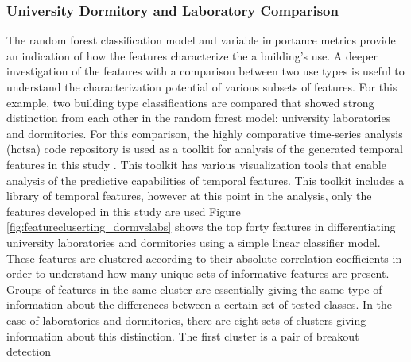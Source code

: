 \subsubsection{University Dormitory and Laboratory Comparison}
\label{sec:dormvslab}

The random forest classification model and variable importance metrics provide an indication of how the features characterize the a building's use. A deeper investigation of the features with a comparison between two use types is useful to understand the characterization potential of various subsets of features. For this example, two building type classifications are compared that showed strong distinction from each other in the random forest model: university laboratories and dormitories. For this comparison, the highly comparative time-series analysis (hctsa) code repository is used as a toolkit for analysis of the generated temporal features in this study \cite{Fulcher_2013}. This toolkit has various visualization tools that enable analysis of the predictive capabilities of temporal features. This toolkit includes a library of temporal features, however at this point in the analysis, only the features developed in this study are used Figure \ref{fig:featurecluserting_dormvslabs} shows the top forty features in differentiating university laboratories and dormitories using a simple linear classifier model. These features are clustered according to their absolute correlation coefficients in order to understand how many unique sets of informative features are present. Groups of features in the same cluster are essentially giving the same type of information about the differences between a certain set of tested classes. In the case of laboratories and dormitories, there are eight sets of clusters giving information about this distinction. The first cluster is a pair of breakout detection